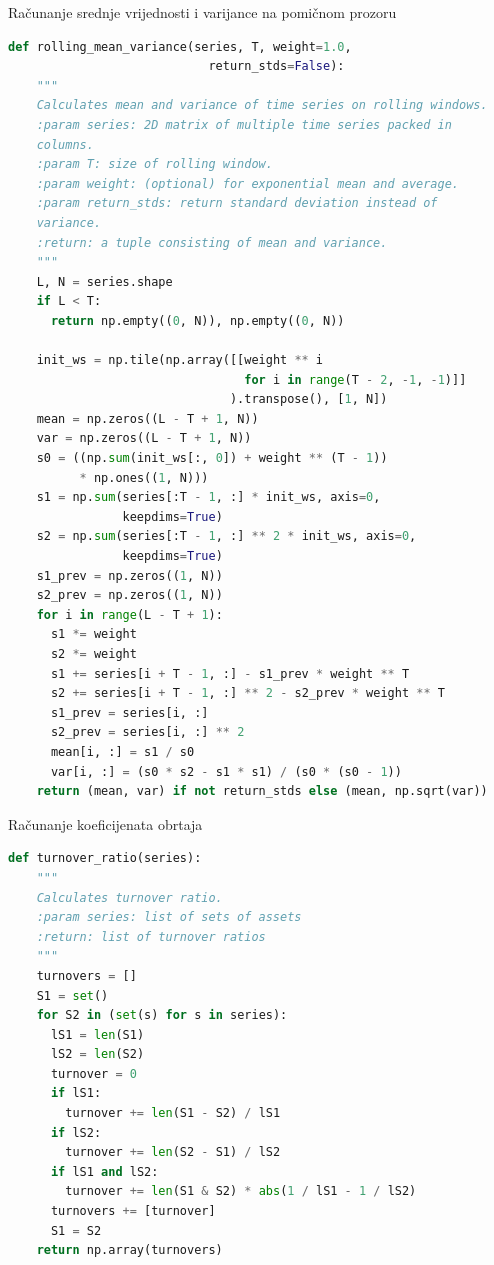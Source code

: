 \documentclass[lmodern, utf8, diplomski, numeric]{fer}
\begin{document}
  \begin{description}
    \item[Računanje srednje vrijednosti i varijance na pomičnom prozoru]
  \end{description}
  \begin{lstlisting}[language=Python, basicstyle=\footnotesize\ttfamily]
  def rolling_mean_variance(series, T, weight=1.0,
                            return_stds=False):
    """
    Calculates mean and variance of time series on rolling windows.
    :param series: 2D matrix of multiple time series packed in
    columns.
    :param T: size of rolling window.
    :param weight: (optional) for exponential mean and average.
    :param return_stds: return standard deviation instead of 
    variance.
    :return: a tuple consisting of mean and variance.
    """
    L, N = series.shape
    if L < T:
      return np.empty((0, N)), np.empty((0, N))
      
    init_ws = np.tile(np.array([[weight ** i
                                 for i in range(T - 2, -1, -1)]]
                               ).transpose(), [1, N])
    mean = np.zeros((L - T + 1, N))
    var = np.zeros((L - T + 1, N))
    s0 = ((np.sum(init_ws[:, 0]) + weight ** (T - 1)) 
          * np.ones((1, N)))
    s1 = np.sum(series[:T - 1, :] * init_ws, axis=0,
                keepdims=True)
    s2 = np.sum(series[:T - 1, :] ** 2 * init_ws, axis=0,
                keepdims=True)
    s1_prev = np.zeros((1, N))
    s2_prev = np.zeros((1, N))
    for i in range(L - T + 1):
      s1 *= weight
      s2 *= weight
      s1 += series[i + T - 1, :] - s1_prev * weight ** T
      s2 += series[i + T - 1, :] ** 2 - s2_prev * weight ** T
      s1_prev = series[i, :]
      s2_prev = series[i, :] ** 2
      mean[i, :] = s1 / s0
      var[i, :] = (s0 * s2 - s1 * s1) / (s0 * (s0 - 1))
    return (mean, var) if not return_stds else (mean, np.sqrt(var))
  \end{lstlisting}
  \begin{description}
    \item[Računanje koeficijenata obrtaja]
  \end{description}
  \begin{lstlisting}[language=Python, basicstyle=\footnotesize\ttfamily]
  def turnover_ratio(series):
    """
    Calculates turnover ratio.
    :param series: list of sets of assets
    :return: list of turnover ratios
    """
    turnovers = []
    S1 = set()
    for S2 in (set(s) for s in series):
      lS1 = len(S1)
      lS2 = len(S2)
      turnover = 0
      if lS1:
        turnover += len(S1 - S2) / lS1
      if lS2:
        turnover += len(S2 - S1) / lS2
      if lS1 and lS2:
        turnover += len(S1 & S2) * abs(1 / lS1 - 1 / lS2)
      turnovers += [turnover]
      S1 = S2
    return np.array(turnovers)
  \end{lstlisting}
\end{document}

